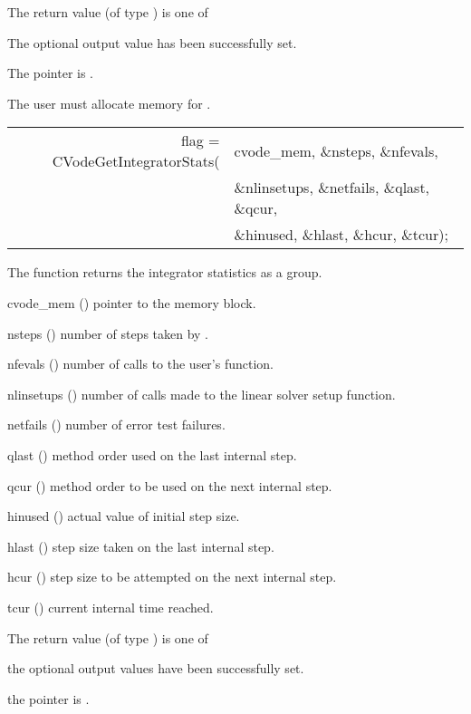 {
  The return value  (of type ) is one of
  \begin{args}
  \item[\Id{CV\_SUCCESS}] 
    The optional output value has been successfully set.
  \item[\Id{CV\_MEM\_NULL}]
    The  pointer is .
  \end{args}
}
{
  {\warn} The user must allocate memory for .
}
{
  \begin{tabular}[t]{@{}r@{}l@{}}
    flag = CVodeGetIntegratorStats(&cvode\_mem, \&nsteps, \&nfevals, \\
                                   &\&nlinsetups, \&netfails, \&qlast, \&qcur, \\
                                   &\&hinused, \&hlast, \&hcur, \&tcur);
  \end{tabular}
}
{
  The function  returns the {\cvode} integrator
  statistics as a group.
}
{
  \begin{args}[nlinsetups]
  \item[cvode\_mem] ()
    pointer to the {\cvode} memory block.
  \item[nsteps] ()
    number of steps taken by {\cvode}.
  \item[nfevals] ()
    number of calls to the user's  function.
  \item[nlinsetups] ()
    number of calls made to the linear solver setup function.
  \item[netfails] ()
    number of error test failures.
  \item[qlast] ()
    method order used on the last internal step.
  \item[qcur] ()
    method order to be used on the next internal step.
  \item[hinused] ()
    actual value of initial step size.
  \item[hlast] ()
    step size taken on the last internal step.
  \item[hcur] ()
    step size to be attempted on the next internal step.
  \item[tcur] ()
    current internal time reached.
  \end{args}
}
{
  The return value  (of type ) is one of
  \begin{args}
  \item[\Id{CV\_SUCCESS}] 
    the optional output values have been successfully set.
  \item[\Id{CV\_MEM\_NULL}]
    the  pointer is .
  \end{args}
}
